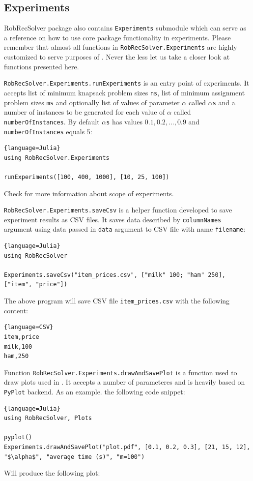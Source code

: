 \subsection{Experiments}
RobRecSolver package also contains \texttt{Experiments} submodule which can serve as a reference on how to use core package functionality in experiments. Please remember that almost all functions in \texttt{RobRecSolver.Experiments} are highly customized to serve purposes of \cite{DBLP:journals/corr/abs-1811-06719}. Never the less let us take a closer look at functions presented here.

\texttt{RobRecSolver.Experiments.runExperiments} is an entry point of experiments. It accepts list of minimum knapsack problem sizes \texttt{ns}, list of minimum assignment problem sizes \texttt{ms} and optionally list of values of parameter $\alpha$ called \texttt{$\alpha$s} and a number of instances to be generated for each value of $\alpha$ called \texttt{numberOfInstances}. By default \texttt{$\alpha$s} has values $0.1,0.2,...,0.9$ and \texttt{numberOfInstances} equals 5:
\begin{lstlisting}[mathescape]{language=Julia}
using RobRecSolver.Experiments

runExperiments([100, 400, 1000], [10, 25, 100])
\end{lstlisting}
Check \cite{DBLP:journals/corr/abs-1811-06719} for more information about scope of experiments.

\texttt{RobRecSolver.Experiments.saveCsv} is a helper function developed to save experiment results as CSV files. It saves data described by \texttt{columnNames} argument using data passed in \texttt{data} argument to CSV file with name \texttt{filename}:
\begin{lstlisting}[mathescape]{language=Julia}
using RobRecSolver

Experiments.saveCsv("item_prices.csv", ["milk" 100; "ham" 250], ["item", "price"])
\end{lstlisting}
The above program will save CSV file \texttt{item\_prices.csv} with the following content:
\begin{lstlisting}{language=CSV}
item,price
milk,100
ham,250
\end{lstlisting}

Function \texttt{RobRecSolver.Experiments.drawAndSavePlot} is a function used to draw plots used in \cite{DBLP:journals/corr/abs-1811-06719}. It accepts a number of parameteres and is heavily based on \texttt{PyPlot} backend. As an example. the following code snippet:
\begin{lstlisting}[mathescape]{language=Julia}
using RobRecSolver, Plots

pyplot()
Experiments.drawAndSavePlot("plot.pdf", [0.1, 0.2, 0.3], [21, 15, 12], "$\alpha$", "average time (s)", "m=100")
\end{lstlisting}
Will produce the following plot:

